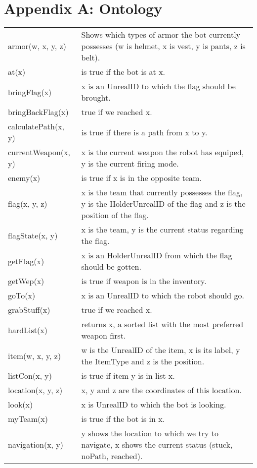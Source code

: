 \chapter*{Appendix A: Ontology}
\begin{tabular}{ l | p{12cm}}
  armor(w, x, y, z) & Shows which types of armor the bot currently possesses (w is helmet, x is vest, y is pants, z is belt). \\
  at(x) & is true if the bot is at x. \\
  bringFlag(x) & x is an UnrealID to which the flag should be brought. \\
  bringBackFlag(x) & true if we reached x. \\
  calculatePath(x, y) & is true if there is a path from x to y. \\
  currentWeapon(x, y) & x is the current weapon the robot has equiped, y is the current firing mode. \\
  enemy(x) & is true if x is in the opposite team. \\
  flag(x, y, z) & x is the team that currently possesses the flag, y is the HolderUnrealID of the flag and z is the position of the flag. \\
  flagState(x, y) & x is the team, y is the current status regarding the flag. \\
  getFlag(x) & x is an HolderUnrealID from which the flag should be gotten. \\
  getWep(x) & is true if weapon is in the inventory. \\
  goTo(x) & x is an UnrealID to which the robot should go. \\
  grabStuff(x) & true if we reached x. \\
  hardList(x) & returns x, a sorted list with the most preferred weapon first. \\
  item(w, x, y, z) & w is the UnrealID of the item, x is its label, y the ItemType and z is the position. \\
  listCon(x, y) & is true if item y is in list x. \\
  location(x, y, z) & x, y and z are the coordinates of this location. \\
  look(x) & x is UnrealID to which the bot is looking. \\
  myTeam(x) & is true if the bot is in x. \\
  navigation(x, y) & y shows the location to which we try to navigate, x shows the current status (stuck, noPath, reached). \\

\end{tabular}
